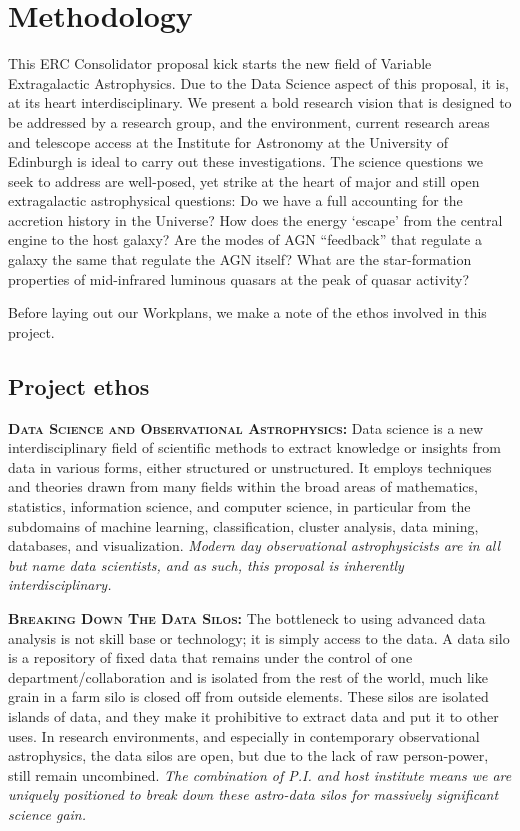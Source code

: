 \section{Methodology}
\noindent
This ERC Consolidator proposal kick starts the new field of Variable
Extragalactic Astrophysics. Due to the Data Science aspect of this
proposal, it is, at its heart interdisciplinary.  We present a bold
research vision that is designed to be addressed by a research group,
and the environment, current research areas and telescope access at
the Institute for Astronomy at the University of Edinburgh is ideal to
carry out these investigations.  The science questions we seek to
address are well-posed, yet strike at the heart of major and still
open extragalactic astrophysical questions: Do we have a full
accounting for the accretion history in the Universe?  How does the
energy `escape' from the central engine to the host galaxy?  Are the
modes of AGN ``feedback'' that regulate a galaxy the same that
regulate the AGN itself?  What are the star-formation properties of
mid-infrared luminous quasars at the peak of quasar activity?

\smallskip
\smallskip
\noindent
Before laying out our Workplans, we make a note of the ethos involved in this project. 

\subsection{Project ethos}
\smallskip
\smallskip
\noindent
\textbf{\textsc{{Data Science and Observational Astrophysics: }}}
Data science is a new interdisciplinary field of scientific methods to
extract knowledge or insights from data in various forms, either
structured or unstructured. It employs techniques and theories drawn
from many fields within the broad areas of mathematics, statistics,
information science, and computer science, in particular from the
subdomains of machine learning, classification, cluster analysis, data
mining, databases, and visualization.  {\it Modern day observational
astrophysicists are in all but name data scientists, and as such, this
proposal is inherently interdisciplinary.}

\smallskip
\smallskip
\noindent
\textbf{\textsc{Breaking Down The Data Silos: }}
The bottleneck to using advanced data analysis is not skill base or
technology; it is simply access to the data.  A data silo is a
repository of fixed data that remains under the control of one
department/collaboration and is isolated from the rest of the world,
much like grain in a farm silo is closed off from outside
elements. These silos are isolated islands of data, and they make it
prohibitive to extract data and put it to other uses. In research
environments, and especially in contemporary observational
astrophysics, the data silos are open, but due to the lack of raw
person-power, still remain uncombined. {\it The combination of P.I. and
host institute means we are uniquely positioned to break down these
astro-data silos for massively significant science gain.}

